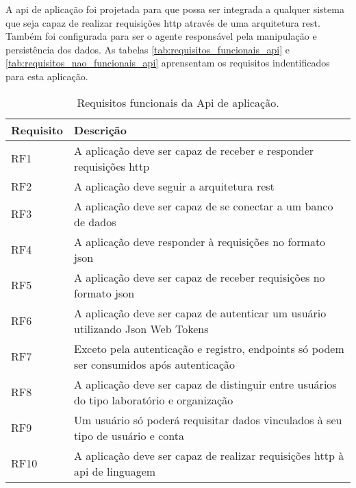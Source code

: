A \gls{api} de aplicação foi projetada para que possa ser integrada a qualquer sistema que seja capaz de realizar requisições \gls{http} através de uma arquitetura \gls{rest}. Também foi configurada para ser o agente responsável pela manipulação e persistência dos dados. As tabelas \autoref{tab:requisitos_funcionais_api} e \autoref{tab:requisitos_nao_funcionais_api} aprensentam os requisitos indentificados para esta aplicação.

\begin{table}[htb]
  \caption{Requisitos funcionais da Api de aplicação.}
  \label{tab:requisitos_funcionais_api}
  \begin{tabularx}{\textwidth}{l|l}
    \hline
    \textbf{Requisito} & \textbf{Descrição}                                                                        \\ \hline
    RF1                & A aplicação deve ser capaz de receber e responder requisições \gls{http}                  \\
    RF2                & A aplicação deve seguir a arquitetura \gls{rest}                                          \\
    RF3                & A aplicação deve ser capaz de se conectar a um banco de dados                             \\
    RF4                & A aplicação deve responder à requisições no formato \gls{json}                            \\
    RF5                & A aplicação deve ser capaz de receber requisições no formato \gls{json}                   \\
    RF6                & A aplicação deve ser capaz de autenticar um usuário utilizando Json Web Tokens            \\
    RF7                & Exceto pela autenticação e registro, endpoints só podem ser consumidos após autenticação  \\
    RF8                & A aplicação deve ser capaz de distinguir entre usuários do tipo laboratório e organização \\
    RF9                & Um usuário só poderá requisitar dados vinculados à seu tipo de usuário e conta            \\
    RF10               & A aplicação deve ser capaz de realizar requisições \gls{http} à \gls{api} de linguagem    \\ \hline
  \end{tabularx}
  \fonte{}
\end{table}

